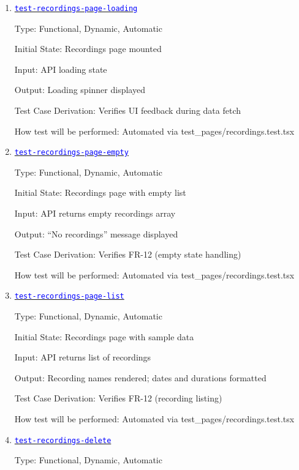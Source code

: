 \documentclass[12pt, titlepage]{article}
\newcommand{\tid}[1]{\hyperlink{tid:#1}{\textcolor{blue}{\texttt{#1}}}}
\begin{document}
\begin{enumerate}

  \item{\tid{test-recordings-page-loading}\\}

        Type: Functional, Dynamic, Automatic

        Initial State: Recordings page mounted

        Input: API loading state

        Output: Loading spinner displayed

        Test Case Derivation: Verifies UI feedback during data fetch

        How test will be performed: Automated via test\_pages/recordings.test.tsx

  \item{\tid{test-recordings-page-empty}\\}

        Type: Functional, Dynamic, Automatic

        Initial State: Recordings page with empty list

        Input: API returns empty recordings array

        Output: ``No recordings'' message displayed

        Test Case Derivation: Verifies FR-12 (empty state handling)

        How test will be performed: Automated via test\_pages/recordings.test.tsx

  \item{\tid{test-recordings-page-list}\\}

        Type: Functional, Dynamic, Automatic

        Initial State: Recordings page with sample data

        Input: API returns list of recordings

        Output: Recording names rendered; dates and durations formatted

        Test Case Derivation: Verifies FR-12 (recording listing)

        How test will be performed: Automated via test\_pages/recordings.test.tsx

  \item{\tid{test-recordings-delete}\\}

        Type: Functional, Dynamic, Automatic


\end{enumerate}
\end{document}
